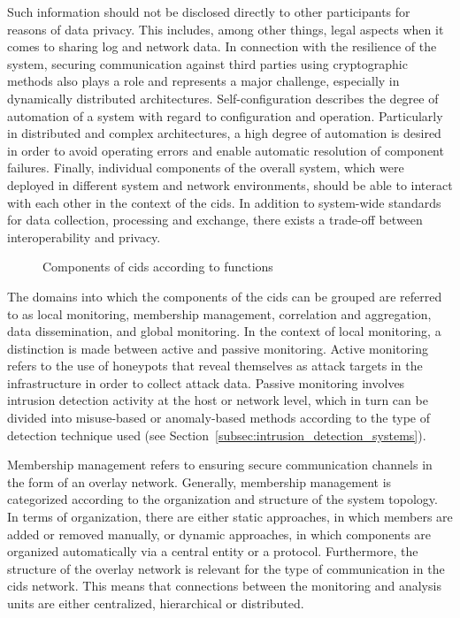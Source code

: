 Such information should not be disclosed directly to other participants for reasons of data privacy. This includes, among other things, legal aspects when it comes to sharing log and network data. In connection with the resilience of the system, securing communication against third parties using cryptographic methods also plays a role and represents a major challenge, especially in dynamically distributed architectures. Self-configuration describes the degree of automation of a system with regard to configuration and operation. Particularly in distributed and complex architectures, a high degree of automation is desired in order to avoid operating errors and enable automatic resolution of component failures. Finally, individual components of the overall system, which were deployed in different system and network environments, should be able to interact with each other in the context of the \gls{cids}. In addition to system-wide standards for data collection, processing and exchange, there exists a trade-off between interoperability and privacy.

\begin{figure}[t]
    \centering
    
    \caption{Components of \gls{cids} according to functions}
    \label{fig:cids_components}
\end{figure}

The domains into which the components of the \gls{cids} can be grouped are referred to as local monitoring, membership management, correlation and aggregation, data dissemination, and global monitoring. In the context of local monitoring, a distinction is made between active and passive monitoring. Active monitoring refers to the use of honeypots that reveal themselves as attack targets in the infrastructure in order to collect attack data. Passive monitoring involves intrusion detection activity at the host or network level, which in turn can be divided into misuse-based or anomaly-based methods according to the type of detection technique used (see Section~\ref{subsec:intrusion_detection_systems}). 

Membership management refers to ensuring secure communication channels in the form of an overlay network. Generally, membership management is categorized according to the organization and structure of the system topology. In terms of organization, there are either static approaches, in which members are added or removed manually, or dynamic approaches, in which components are organized automatically via a central entity or a protocol. Furthermore, the structure of the overlay network is relevant for the type of communication in the \gls{cids} network. This means that connections between the monitoring and analysis units are either centralized, hierarchical or distributed. 

